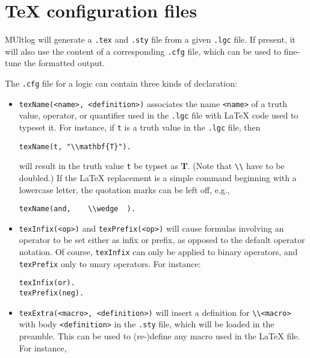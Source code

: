 \documentclass[
]{article}
\newcommand{\passthrough}[1]{#1}
\begin{document}
\hypertarget{tex-configuration-files}{%
\section{TeX configuration files}\label{tex-configuration-files}}

MUltlog will generate a \passthrough{\lstinline!.tex!} and
\passthrough{\lstinline!.sty!} file from a given
\passthrough{\lstinline!.lgc!} file. If present, it will also use the
content of a corresponding \passthrough{\lstinline!.cfg!} file, which
can be used to fine-tune the formatted output.

The \passthrough{\lstinline!.cfg!} file for a logic can contain three
kinds of declaration:

\begin{itemize}
\item
  \passthrough{\lstinline!texName(<name>, <definition>)!} associates the
  name \passthrough{\lstinline!<name>!} of a truth value, operator, or
  quantifier used in the \passthrough{\lstinline!.lgc!} file with LaTeX
  code used to typeset it. For instance, if \passthrough{\lstinline!t!}
  is a truth value in the \passthrough{\lstinline!.lgc!} file, then

\begin{lstlisting}
texName(t, "\\mathbf{T}").
\end{lstlisting}

  will result in the truth value \passthrough{\lstinline!t!} be typset
  as \(\mathbf{T}\). (Note that \passthrough{\lstinline!\\!} have to be
  doubled.) If the LaTeX replacement is a simple command beginning with
  a lowercase letter, the quotation marks can be left off, e.g.,

\begin{lstlisting}
texName(and,    \\wedge  ).
\end{lstlisting}
\item
  \passthrough{\lstinline!texInfix(<op>)!} and
  \passthrough{\lstinline!texPrefix(<op>)!} will cause formulas
  involving an operator to be set either as infix or prefix, as opposed
  to the default operator notation. Of course,
  \passthrough{\lstinline!texInfix!} can only be applied to binary
  operators, and \passthrough{\lstinline!texPrefix!} only to unary
  operators. For instance:

\begin{lstlisting}
texInfix(or).
texPrefix(neg).
\end{lstlisting}
\item
  \passthrough{\lstinline!texExtra(<macro>, <definition>)!} will insert
  a definition for \passthrough{\lstinline!\\<macro>!} with body
  \passthrough{\lstinline!<definition>!} in the
  \passthrough{\lstinline!.sty!} file, which will be loaded in the
  preamble. This can be used to (re-)define any macro used in the LaTeX
  file. For instance,


\end{itemize}
\end{document}

